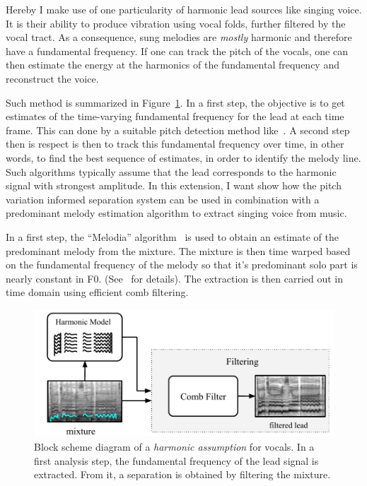 Hereby I make use of one particularity of harmonic lead sources like singing voice.
It is their ability to produce vibration using vocal folds, further filtered by the vocal tract.
As a consequence, sung melodies are \textit{mostly} harmonic and therefore have a fundamental frequency.
If one can track the pitch of the vocals, one can then estimate the energy at the harmonics of the fundamental frequency and reconstruct the voice.

Such method is summarized in Figure~\ref{fig:methods_harmonicity}.
In a first step, the objective is to get estimates of the time-varying fundamental frequency for the lead at each time frame.
This can done by a suitable pitch detection method like~\cite{de2002yin}.
A second step then is respect is then to track this fundamental frequency over time, in other words, to find the best sequence of estimates, in order to identify the melody line.
Such algorithms typically assume that the lead corresponds to the harmonic signal with strongest amplitude.
In this extension, I want show how the pitch variation informed separation system can be used in combination with a predominant melody estimation algorithm to extract singing voice from music.
\par
In a first step, the ``Melodia'' algorithm~\cite{salamon12} is used to obtain an estimate of the predominant melody from the mixture.
The mixture is then time warped based on the fundamental frequency of the melody so that it’s predominant solo part is nearly constant in F0. (See~\cite{salamon12} for details). The extraction is then carried out in time domain using efficient comb filtering.

\begin{figure}[htbp]
	\centering
  \includegraphics[width=\columnwidth]{Chapters/05_Separation_Known/figures/comb_filter.pdf}
	\caption{Block scheme diagram of a \textit{harmonic assumption} for vocals. In a first analysis step, the fundamental frequency of the lead signal is extracted. From it, a separation is obtained by filtering the mixture.}
	\label{fig:methods_harmonicity}
\end{figure}

